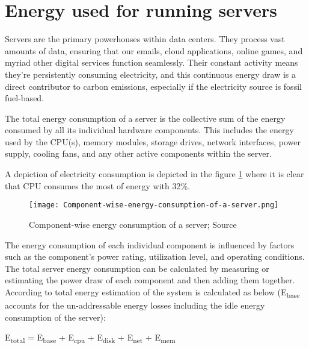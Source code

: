 \documentclass[
  a4paper,  %
  twoside,  %
  bibliography=totoc,
  headsepline,
  cleardoublepage=empty,
  parskip=half,
  draft=false
]{scrbook}
\begin{document}
\section{Energy used for running servers}

Servers are the primary powerhouses within data centers. They process vast amounts of data, ensuring  that  our  emails,  cloud  applications,  online games,  and  myriad  other  digital  services function seamlessly\cite{techtargetMajorServer}. Their constant  activity means they're persistently consuming electricity\cite{energyinnovationMuchEnergy}, and this continuous energy draw is a direct contributor to carbon emissions, especially if the electricity source is fossil fuel-based.

The total energy consumption of a server is the collective sum of the energy consumed by all its individual hardware components. This includes the energy used by the CPU(s), memory modules, storage drives, network interfaces, power supply, cooling fans, and any other active components within the server\cite{ahmed2021review}. 


A depiction of electricity consumption is depicted in the figure \ref{component_wise_consumption} where it is clear that CPU consumes the most of energy with 32\%.

\begin{figure}
	\centering
	\texttt{[image: Component-wise-energy-consumption-of-a-server.png]}
	\caption{Component-wise energy consumption of a server; Source\cite{ahmed2021review}}
	\label{component_wise_consumption}
\end{figure}

The energy consumption of each individual component is influenced by factors such as the component's power rating, utilization level, and operating conditions. The total server energy consumption can be calculated by measuring or estimating the power draw of each component and then adding them together. According to \cite{chatzipapas2015challenge} total energy estimation of the system is calculated as below (E\textsubscript{base} accounts for the un-addressable energy losses including the idle energy consumption of the server):

\begin{center}
	E\textsubscript{total} = E\textsubscript{base} + E\textsubscript{cpu} + E\textsubscript{disk} + E\textsubscript{net} + E\textsubscript{mem}
\end{center}
\end{document}
